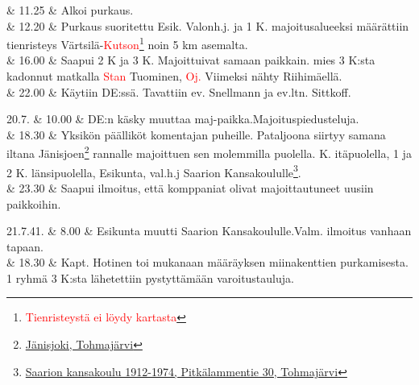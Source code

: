 \documentclass[11pt,a5paper,oneside]{book}
\begin{document}
& 11.25 & Alkoi purkaus. \\

& 12.20 & Purkaus suoritettu \newline Esik. Valonh.j. ja 1 K. majoitusalueeksi määrättiin tienristeys Värtsilä-\textcolor{red}{Kutson}\footnote{\textcolor{red}{Tienristeystä ei löydy kartasta}} noin 5 km asemalta. \\

& 16.00 & Saapui 2 K ja 3 K. Majoittuivat samaan paikkain. mies 3 K:sta kadonnut matkalla \textcolor{red}{Stan} Tuominen, \textcolor{red}{Oj.} Viimeksi nähty Riihimäellä. \newline\newline \\

& 22.00 & Käytiin DE:ssä. Tavattiin ev. Snellmann ja ev.ltn. Sittkoff. \\
\newpage

20.7. & 10.00 & DE:n käsky muuttaa maj-paikka.\newline Majoituspiedusteluja. \newline \\

& 18.30 & Yksikön päälliköt komentajan puheille. Pataljoona siirtyy samana iltana Jänisjoen\footnote{\href{https://www.google.fi/maps/place/J\%C3\%A4nisjoki/@62.1921584,30.5864508,14z/}{Jänisjoki, Tohmajärvi}} rannalle majoittuen sen molemmilla puolella. K. itäpuolella, 1 ja 2 K. länsipuolella, Esikunta, val.h.j Saarion Kansakoululle\footnote{\href{https://www.google.fi/maps/place/Pitk\%C3\%A4lammentie+30,+82600+Tohmaj\%C3\%A4rvi/}{Saarion kansakoulu 1912-1974, Pitkälammentie 30, Tohmajärvi}}. \newline \\

& 23.30 & Saapui ilmoitus, että komppaniat olivat majoittautuneet uusiin paikkoihin. \\

\taulustop


21.7.41. & 8.00 & Esikunta muutti Saarion Kansakoululle.\newline Valm. ilmoitus vanhaan tapaan. \newline\newline \\

& 18.30 & Kapt. Hotinen toi mukanaan määräyksen miinakenttien purkamisesta. 1 ryhmä 3 K:sta lähetettiin pystyttämään varoitustauluja. \newline \\
\end{document}
